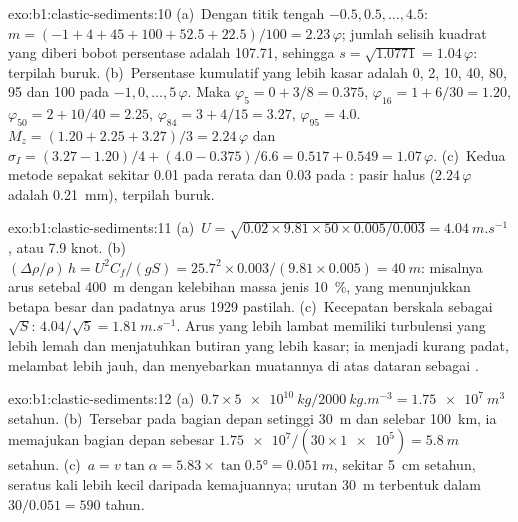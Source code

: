\begin{solution}{exo:b1:clastic-sediments:10}
(a)~Dengan titik tengah $-0.5, 0.5, \ldots, 4.5$: $m = (-1 + 4 + 45 + 100 + 52.5
+ 22.5)/100 = 2.23\,\varphi$; jumlah selisih kuadrat yang diberi bobot persentase adalah \num{107.71}, sehingga $s = \sqrt{1.0771} = 1.04\,\varphi$:
terpilah buruk. (b)~Persentase kumulatif yang lebih kasar adalah 0, 2, 10, 40, 80, 95 dan 100 pada $-1, 0, \ldots, 5\,\varphi$. Maka $\varphi_5 = 0 + 3/8 = 0.375$,
$\varphi_{16} = 1 + 6/30 = 1.20$, $\varphi_{50} = 2 + 10/40 = 2.25$,
$\varphi_{84} = 3 + 4/15 = 3.27$, $\varphi_{95} = 4.0$. $M_z = (1.20 + 2.25 +
3.27)/3 = 2.24\,\varphi$ dan $\sigma_I = (3.27 - 1.20)/4 + (4.0 - 0.375)/6.6 =
0.517 + 0.549 = 1.07\,\varphi$. (c)~Kedua metode sepakat sekitar
\num{0.01} pada rerata dan \num{0.03} pada : pasir halus
($2.24\,\varphi$ adalah \qty{0.21}{mm}), terpilah buruk.
\end{solution}

\begin{solution}{exo:b1:clastic-sediments:11}
(a)~$U = \sqrt{0.02 \times 9.81 \times 50 \times 0.005/0.003} =
\qty{4.04}{m.s^{-1}}$, atau 7.9 knot. (b)~$(\Delta\rho/\rho)\,h = U^2
C_f/(gS) = 25.7^2 \times 0.003/(9.81 \times 0.005) = \qty{40}{m}$: misalnya
arus setebal \qty{400}{m} dengan kelebihan massa jenis \qty{10}{\percent}, yang
menunjukkan betapa besar dan padatnya arus 1929 pastilah. (c)~Kecepatan
berskala sebagai $\sqrt S$: $4.04/\sqrt 5 = \qty{1.81}{m.s^{-1}}$. Arus yang
lebih lambat memiliki turbulensi yang lebih lemah dan menjatuhkan butiran yang lebih kasar; ia menjadi kurang padat, melambat lebih jauh, dan menyebarkan muatannya di atas dataran sebagai .
\end{solution}

\begin{solution}{exo:b1:clastic-sediments:12}
(a)~$0.7 \times \qty{5e10}{kg}/\qty{2000}{kg.m^{-3}} = \qty{1.75e7}{m^3}$ setahun. (b)~Tersebar pada bagian depan setinggi \qty{30}{m} dan selebar \qty{100}{km}, ia memajukan bagian depan sebesar $\num{1.75e7}/(30 \times \num{1e5}) = \qty{5.8}{m}$ setahun. (c)~$a = v\tan\alpha = 5.83 \times \tan\ang{0.5} = \qty{0.051}{m}$, sekitar \qty{5}{cm} setahun, seratus kali lebih kecil daripada kemajuannya; urutan \qty{30}{m} terbentuk dalam $30/0.051 = 590$ tahun.
\end{solution}

